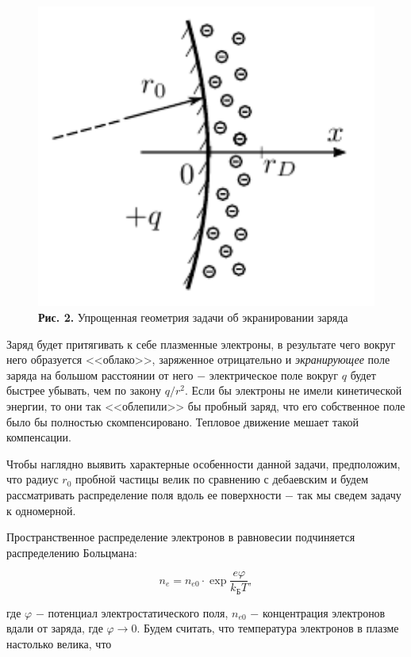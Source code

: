 \documentclass[a4paper,12pt]{article} %
\begin{document}
\begin{figure}
\begin{center}
    \includegraphics[width=1\textwidth]{3.5.1_2.png}
    \textbf{Рис. 2.} Упрощенная геометрия задачи об экранировании заряда
\end{center}
\end{figure}

\hfill \break Заряд будет притягивать к себе плазменные электроны, в результате чего вокруг него образуется <<облако>>, заряженное отрицательно и \textit{экранирующее} поле заряда на большом расстоянии от него $-$ электрическое поле вокруг $q$ будет быстрее убывать, чем по закону $q/r^2$. Если бы электроны не имели кинетической энергии, то они так <<облепили>> бы пробный заряд, что его собственное поле было бы полностью скомпенсировано. Тепловое движение мешает такой компенсации.

\hfill \break Чтобы наглядно выявить характерные особенности данной задачи, предположим, что радиус $r_{0}$ пробной частицы велик по сравнению с дебаевским и будем рассматривать распределение поля вдоль ее поверхности $-$ так мы сведем задачу к одномерной.

\hfill \break Пространственное распределение электронов в равновесии подчиняется распределению Больцмана:

$$
n_{e} = n_{e0} \cdot \exp{\frac{e\varphi}{k_\text{Б}T}},
$$

\hfill \break где $\varphi$ $-$ потенциал электростатического поля, $n_{e0}$ $-$ концентрация электронов вдали от заряда, где $\varphi \rightarrow 0$. Будем считать, что температура электронов в плазме настолько велика, что 
\end{document}
